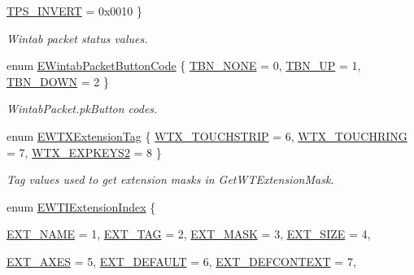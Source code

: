 \begin{DoxyCompactItemize}
\par
\hyperlink{namespace_wintab_d_n_afe14d17b83fb34685a298d857c203cac}{TPS\_\-INVERT} =  0x0010
 \}
\begin{DoxyCompactList}\small\item\em Wintab packet status values. \item\end{DoxyCompactList}\item 
enum \hyperlink{namespace_wintab_d_n_a0829e0e054dd601b4f043415c0090c31}{EWintabPacketButtonCode} \{ \hyperlink{namespace_wintab_d_n_a0829e0e054dd601b4f043415c0090c31}{TBN\_\-NONE} =  0, 
\hyperlink{namespace_wintab_d_n_a0829e0e054dd601b4f043415c0090c31}{TBN\_\-UP} =  1, 
\hyperlink{namespace_wintab_d_n_a0829e0e054dd601b4f043415c0090c31}{TBN\_\-DOWN} =  2
 \}
\begin{DoxyCompactList}\small\item\em WintabPacket.pkButton codes. \item\end{DoxyCompactList}\item 
enum \hyperlink{namespace_wintab_d_n_a303ef868b8887dc43872ddac8a7d059b}{EWTXExtensionTag} \{ \hyperlink{namespace_wintab_d_n_a303ef868b8887dc43872ddac8a7d059b}{WTX\_\-TOUCHSTRIP} =  6, 
\hyperlink{namespace_wintab_d_n_a303ef868b8887dc43872ddac8a7d059b}{WTX\_\-TOUCHRING} =  7, 
\hyperlink{namespace_wintab_d_n_a303ef868b8887dc43872ddac8a7d059b}{WTX\_\-EXPKEYS2} =  8
 \}
\begin{DoxyCompactList}\small\item\em Tag values used to get extension masks in GetWTExtensionMask. \item\end{DoxyCompactList}\item 
enum \hyperlink{namespace_wintab_d_n_a52875c234488913934e0d49ac13c438d}{EWTIExtensionIndex} \{ \par
\hyperlink{namespace_wintab_d_n_a52875c234488913934e0d49ac13c438d}{EXT\_\-NAME} =  1, 
\hyperlink{namespace_wintab_d_n_a52875c234488913934e0d49ac13c438d}{EXT\_\-TAG} =  2, 
\hyperlink{namespace_wintab_d_n_a52875c234488913934e0d49ac13c438d}{EXT\_\-MASK} =  3, 
\hyperlink{namespace_wintab_d_n_a52875c234488913934e0d49ac13c438d}{EXT\_\-SIZE} =  4, 
\par
\hyperlink{namespace_wintab_d_n_a52875c234488913934e0d49ac13c438d}{EXT\_\-AXES} =  5, 
\hyperlink{namespace_wintab_d_n_a52875c234488913934e0d49ac13c438d}{EXT\_\-DEFAULT} =  6, 
\hyperlink{namespace_wintab_d_n_a52875c234488913934e0d49ac13c438d}{EXT\_\-DEFCONTEXT} =  7, 

\end{DoxyCompactItemize}
